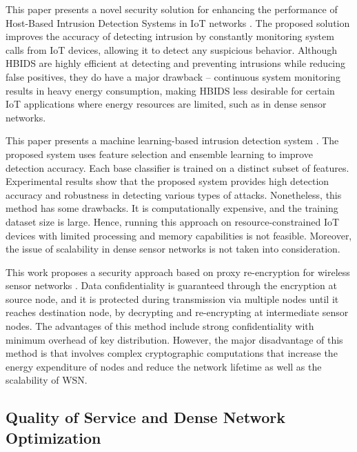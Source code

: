 \documentclass[a4paper,fleqn]{cas-dc}
\numberwithin{equation}{section}
\begin{document}
This paper presents a novel security solution for enhancing the performance of Host-Based Intrusion Detection Systems in IoT networks \cite{Nallakaruppan202431788}. The proposed solution improves the accuracy of detecting intrusion by constantly monitoring system calls from IoT devices, allowing it to detect any suspicious behavior. Although HBIDS are highly efficient at detecting and preventing intrusions while reducing false positives, they do have a major drawback – continuous system monitoring results in heavy energy consumption, making HBIDS less desirable for certain IoT applications where energy resources are limited, such as in dense sensor networks.

This paper presents a machine learning-based intrusion detection system \cite{Almotairi2024}. The proposed system uses feature selection and ensemble learning to improve detection accuracy. Each base classifier is trained on a distinct subset of features. Experimental results show that the proposed system provides high detection accuracy and robustness in detecting various types of attacks. Nonetheless, this method has some drawbacks. It is computationally expensive, and the training dataset size is large. Hence, running this approach on resource-constrained IoT devices with limited processing and memory capabilities is not feasible. Moreover, the issue of scalability in dense sensor networks is not taken into consideration.

This work proposes a security approach based on proxy re-encryption for wireless sensor networks \cite{Khashan202423290}. Data confidentiality is guaranteed through the encryption at source node, and it is protected during transmission via multiple nodes until it reaches destination node, by decrypting and re-encrypting at intermediate sensor nodes. The advantages of this method include strong confidentiality with minimum overhead of key distribution. However, the major disadvantage of this method is that involves complex cryptographic computations that increase the energy expenditure of nodes and reduce the network lifetime as well as the scalability of WSN.

\subsection{Quality of Service and Dense Network Optimization}
\end{document}
